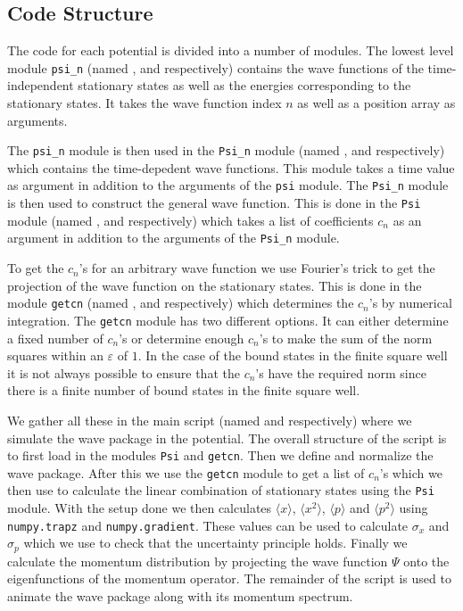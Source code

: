 \documentclass[12pt,a4paper]{article}
\renewcommand{\epsilon}{\varepsilon}
\begin{document}
\subsection{Code Structure}
The code for each potential is divided into a number of modules. The lowest level module \verb!psi_n! (named ,  and  respectively) contains the wave functions of the time-independent stationary states as well as the energies corresponding to the stationary states. It takes the wave function index $n$ as well as a position array as arguments.

The \verb!psi_n! module is then used in the \verb!Psi_n! module (named ,  and  respectively) which contains the time-depedent wave functions. This module takes a time value as argument in addition to the arguments of the \verb!psi! module.  The \verb!Psi_n! module is then used to construct the general wave function. This is done in the \verb!Psi! module (named ,  and  respectively) which takes a list of coefficients $c_n$ as an argument in addition to the arguments of the \verb!Psi_n! module.

To get the $c_n$'s for an arbitrary wave function we use Fourier's trick to get the projection of the wave function on the stationary states. This is done in the module \verb!getcn! (named ,  and  respectively) which determines the $c_n$'s by numerical integration. The \verb!getcn! module has two different options. It can either determine a fixed number of $c_n$'s or determine enough $c_n$'s to make the sum of the norm squares within an $\epsilon$ of $1$. In the case of the bound states in the finite square well it is not always possible to ensure that the $c_n$'s have the required norm since there is a finite number of bound states in the finite square well.

We gather all these in the main script (named  and  respectively) where we simulate the wave package in the potential.	The overall structure of the script is to first load in the modules \verb!Psi! and \verb!getcn!. Then we define and normalize the wave package. After this we use the \verb!getcn! module to get a list of $c_n$'s which we then use to calculate the linear combination of stationary states using the \verb!Psi! module. With the setup done we then calculates $\langle x \rangle$, $\langle x^2 \rangle$, $\langle p \rangle$ and $\langle p^2 \rangle$ using \lstinline{numpy.trapz} and \lstinline{numpy.gradient}. These values can be used to calculate $\sigma_x$ and $\sigma_p$ which we use to check that the uncertainty principle holds. Finally we calculate the momentum distribution by projecting the wave function $\Psi$ onto the eigenfunctions of the momentum operator. The remainder of the script is used to animate the wave package along with its momentum spectrum.
\end{document}
